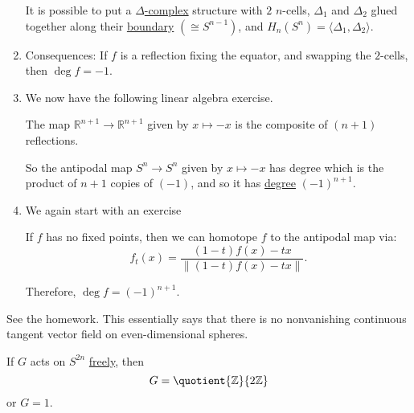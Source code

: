 \begin{remark}
\begin{enumerate}
		      \begin{exercise}
			      It is possible to put a \hyperref[def:delta-complex]{\(\Delta\)-complex} structure with \(2\) \(n\)-cells, \(\Delta_1\) and \(\Delta_2\) glued
			      together along their \hyperref[def:boundary]{boundary} \((\cong S^{n-1})\), and \(H_n(S^n) = \langle \Delta_1, \Delta_2 \rangle \).
		      \end{exercise}
		\item Consequences: If \(f\) is a reflection fixing the equator, and swapping the \(2\)-cells, then \(\deg f = -1\).
		      \begin{figure}[H]
			      \centering
			      \label{fig:reflection-about-equator}
		      \end{figure}
		\item We now have the following linear algebra exercise.
		      \begin{exercise}
			      The map \(\mathbb{R}^{n + 1} \to \mathbb{R}^{n + 1}\) given by \(x \mapsto -x\) is the composite of \((n + 1)\) reflections.
		      \end{exercise}
		      So the antipodal map \(S^n \to S^n\) given by \(x \mapsto -x\) has degree which is the product of \(n + 1\) copies of \((-1)\), and so it has
		      \hyperref[def:degree]{degree} \((-1)^{n + 1}\).
		\item We again start with an exercise
		      \begin{exercise}
			      If \(f\) has no fixed points, then we can homotope \(f\) to the antipodal map via:
			      \[
				      f_t(x) = \frac{(1 - t)f(x) - tx}{\left\lVert (1 - t)f(x) - tx\right\rVert}.
			      \]
		      \end{exercise}

		      Therefore, \(\deg f = (-1)^{n + 1}\).
	\end{enumerate}
\end{remark}

\begin{theorem}\label{thm:hairy-ball-theorem}
	See the homework. This essentially says that there is no nonvanishing continuous tangent vector field on even-dimensional spheres.
\end{theorem}

\begin{theorem}\label{thm-actions-on-spheres}
	If \(G\) acts on \(S^{2n}\) \hyperref[def:free-group]{freely}, then
	\[
		G = \quotient{\mathbb{Z}}{2\mathbb{Z}}
	\]
	or \(G = 1\).
\end{theorem}

